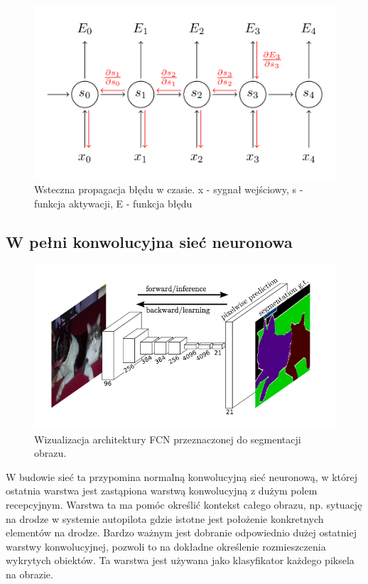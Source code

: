 \documentclass[12pt,a4paper,twoside,titlepage,openright]{book}
\begin{document}
\begin{figure}[ht]
	\centering
			\includegraphics[resolution=100, scale=0.55]{backpropagationThroughTime.png}
		\caption{Wsteczna propagacja błędu w czasie. x - sygnał wejściowy, s - funkcja aktywacji, E - funkcja błędu}
\end{figure}

\subsection{W pełni konwolucyjna sieć neuronowa}

\begin{figure}[ht]
	\centering
			\includegraphics[resolution=100, scale=0.8]{fullyConvolutionalNetwork.png}
		\caption{Wizualizacja architektury FCN przeznaczonej do segmentacji obrazu.}
\end{figure}
W budowie sieć ta przypomina normalną konwolucyjną sieć neuronową, w której ostatnia warstwa jest zastąpiona warstwą konwolucyjną z dużym polem recepcyjnym. Warstwa ta ma pomóc określić kontekst całego obrazu, np. sytuację na drodze w systemie autopilota gdzie istotne jest położenie konkretnych elementów na drodze. Bardzo ważnym jest dobranie odpowiednio dużej ostatniej warstwy konwolucyjnej, pozwoli to na dokładne określenie rozmieszczenia wykrytych obiektów. Ta warstwa jest używana jako klasyfikator każdego piksela na obrazie.
\end{document}
